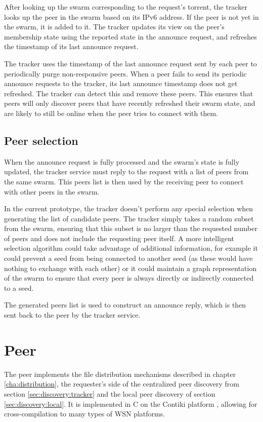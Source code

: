 After looking up the swarm corresponding to the request's torrent, the tracker looks up the peer in the swarm based on its \gls{IPv6} address. If the peer is not yet in the swarm, it is added to it. The tracker updates its view on the peer's membership state using the reported state in the announce request, and refreshes the timestamp of its last announce request.

The tracker uses the timestamp of the last announce request sent by each peer to periodically purge non-responsive peers. When a peer fails to send its periodic announce requests to the tracker, its last announce timestamp does not get refreshed. The tracker can detect this and remove these peers. This ensures that peers will only discover peers that have recently refreshed their swarm state, and are likely to still be online when the peer tries to connect with them.

\subsection{Peer selection}
When the announce request is fully processed and the swarm's state is fully updated, the tracker service must reply to the request with a list of peers from the same swarm. This peers list is then used by the receiving peer to connect with other peers in the swarm.

In the current prototype, the tracker doesn't perform any special selection when generating the list of candidate peers. The tracker simply takes a random subset from the swarm, ensuring that this subset is no larger than the requested number of peers and does not include the requesting peer itself. A more intelligent selection algorithm could take advantage of additional information, for example it could prevent a seed from being connected to another seed (as these would have nothing to exchange with each other) or it could maintain a graph representation of the swarm to ensure that every peer is always directly or indirectly connected to a seed.

The generated peers list is used to construct an announce reply, which is then sent back to the peer by the tracker service.

\section{Peer}
\label{sec:impl:peer}
The peer implements the file distribution mechanisms described in chapter \ref{cha:distribution}, the requester's side of the centralized peer discovery from section \ref{sec:discovery:tracker} and the local peer discovery of section \ref{sec:discovery:local}. It is implemented in C on the Contiki platform \cite{contiki}, allowing for cross-compilation to many types of \gls{WSN} platforms.

